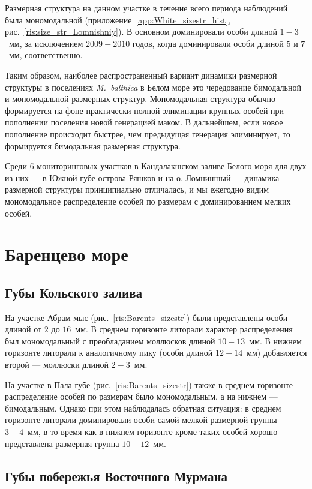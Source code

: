 Размерная структура на данном участке в течение всего периода наблюдений была мономодальной (приложение~\ref{app:White_sizestr_hist}, рис.~\ref{ris:size_str_Lomnishniy}).
В основном доминировали особи длиной $1-3$~мм, за исключением $2009-2010$ годов, когда доминировали особи длиной $5$ и $7$~мм, соответственно.


\bigskip
Таким образом, наиболее распространенный вариант динамики размерной структуры в поселениях {\it M.~balthica} в Белом море это чередование бимодальной и мономодальной размерных структур.
Мономодальная структура обычно формируется на фоне практически полной элиминации крупных особей при пополнении поселения новой генерацией маком.
В дальнейшем, если новое пополнение происходит быстрее, чем предыдущая генерация элиминирует, то формируется бимодальная размерная структура.

Среди 6 мониторинговых участков в Кандалакшском заливе Белого моря для двух из них --- в Южной губе острова Ряшков и на о. Ломнишный --- динамика размерной структуры принципиально отличалась, и мы ежегодно видим мономодальное распределение особей по размерам с доминированием мелких особей.

\afterpage{\clearpage}

		\section{Баренцево море}

		\subsection{Губы Кольского залива}

На участке Абрам-мыс (рис.~\ref{ris:Barents_sizestr}) были представлены особи длиной от $2$ до $16$~мм. 
В среднем горизонте литорали характер распределения был мономодальный с преобладанием моллюсков длиной $10-13$~мм. 
В нижнем горизонте литорали к аналогичному пику (особи длиной $12-14$~мм) добавляется второй — моллюски длиной $2-3$~мм.

На участке в Пала-губе (рис.~\ref{ris:Barents_sizestr}) также в среднем горизонте распределение особей по размерам было мономодальным, а на нижнем --- бимодальным. 
Однако при этом наблюдалась обратная ситуация: в среднем горизонте литорали доминировали особи самой мелкой размерной группы --- $3-4$~мм, в то время как  в нижнем горизонте кроме таких особей  хорошо представлена размерная группа $10-12$~мм.

		\subsection{Губы побережья Восточного Мурмана}

